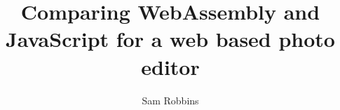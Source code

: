\documentclass{beamer}
\title{Comparing WebAssembly and JavaScript for a web based photo editor}
\author{Sam Robbins}
\institute{Durham University}
\date{}
\begin{document}
\frame{\titlepage}
\end{document}
